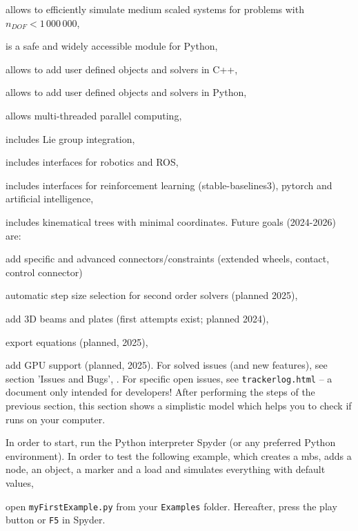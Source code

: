   \item allows to efficiently simulate medium scaled systems for problems with $n_{DOF} < 1\,000\,000$,
  \item is a safe and widely accessible module for Python,
  \item allows to add user defined objects and solvers in C++,
  \item allows to add user defined objects and solvers in Python,
  \item allows multi-threaded parallel computing,
  \item includes Lie group integration,
  \item includes interfaces for robotics and ROS,
  \item includes interfaces for reinforcement learning (stable-baselines3), pytorch and artificial intelligence,
  \item includes kinematical trees with minimal coordinates.
\ei
Future goals (2024-2026) are:
\bi
  \item add specific and advanced connectors/constraints (extended wheels, contact, control connector)
  \item automatic step size selection for second order solvers (planned 2025),
  \item add 3D beams and plates (first attempts exist; planned 2024),
  \item export equations (planned, 2025),
  \item add GPU support (planned, 2025).
\ei
For solved issues (and new features), see section 'Issues and Bugs', .
For specific open issues, see \texttt{trackerlog.html} -- a document only intended for developers!
%
After performing the steps of the previous section, this section shows a simplistic model which helps you to check if \codeName runs on your computer.

In order to start, run the Python interpreter Spyder (or any preferred Python environment).
In order to test the following example, which creates a \ac{mbs}, adds a node, an object, a marker and a load and simulates everything with default values, 
\bi
{}
\item open \texttt{myFirstExample.py} from your \texttt{Examples} folder.
\ei
Hereafter, press the play button or \texttt{F5} in Spyder.
%

